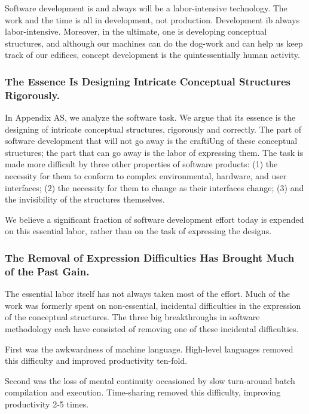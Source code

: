 \documentclass[12pt]{article}
\begin{document}
Software development is and always will be a labor-intensive technology. The work
and the time is all in development, not production. Development ib always labor-intensive.
Moreover, in the ultimate, one is developing conceptual structures, and although our
machines can do the dog-work and can help us keep track of our edifices, concept
development is the quintessentially human activity.

\subsubsection*{The Essence Is Designing Intricate Conceptual Structures Rigorously.}

In Appendix AS, we analyze the software task. We argue that its essence is the
designing of intricate conceptual structures, rigorously and correctly. The
part of software development that will not go away is the craftiUng of these
conceptual structures; the part that can go away is the labor of expressing
them. The task is made more difficult by three other properties of software
products: (1) the necessity for them to conform to complex environmental,
hardware, and user interfaces; (2) the necessity for them to change as their
interfaces change; (3) and the invisibility of the structures themselves.

We believe a significant fraction of software development effort today is
expended on this essential labor, rather than on the task of expressing the
designs.

\subsubsection*{The Removal of Expression Difficulties Has Brought Much of the Past Gain.}

The essential labor itself has not always taken most of the effort. Much of the
work was formerly spent on non-essential, incidental difficulties in the
expression of the conceptual structures. The three big breakthroughs in
software methodology each have consisted of removing one of these incidental
difficulties.

First was the awkwardness of machine language. High-level languages removed
this difficulty and improved productivity ten-fold.

Second was the loss of mental continuity occasioned by slow turn-around batch
compilation and execution. Time-sharing removed this difficulty, improving
productivity 2-5 times.
\end{document}
